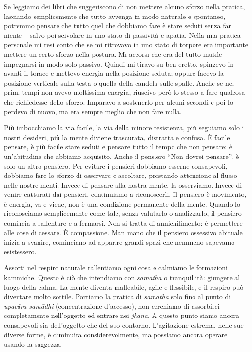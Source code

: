 Se leggiamo dei libri che suggeriscono di non mettere alcuno sforzo
nella pratica, lasciando semplicemente che tutto avvenga in modo
naturale e spontaneo, potremmo pensare che tutto quel che dobbiamo fare
è stare seduti senza far niente -- salvo poi scivolare in uno stato di
passività e apatia. Nella mia pratica personale mi resi conto che se mi
ritrovavo in uno stato di torpore era importante mettere un certo sforzo
nella postura. Mi accorsi che era del tutto inutile impegnarsi in modo
solo passivo. Quindi mi tiravo su ben eretto, spingevo in avanti il
torace e mettevo energia nella posizione seduta; oppure facevo la
posizione verticale sulla testa o quella della candela sulle spalle.
Anche se nei primi tempi non avevo moltissima energia, riuscivo però lo
stesso a fare qualcosa che richiedesse dello sforzo. Imparavo a
sostenerlo per alcuni secondi e poi lo perdevo di nuovo, ma era sempre
meglio che non fare nulla.

Più imbocchiamo la via facile, la via della minore resistenza, più
seguiamo solo i nostri desideri, più la mente diviene trascurata,
distratta e confusa. È facile pensare, è più facile stare seduti e
pensare tutto il tempo che non pensare: è un'abitudine che abbiamo
acquisito. Anche il pensiero ``Non dovrei pensare'', è solo un altro
pensiero. Per evitare i pensieri dobbiamo esserne consapevoli, dobbiamo
fare lo sforzo di osservare e ascoltare, prestando attenzione al flusso
nelle nostre menti. Invece di pensare alla nostra mente, la osserviamo.
Invece di venire catturati dai pensieri, continuiamo a riconoscerli. Il
pensiero è movimento, è energia, va e viene, non è una condizione
permanente della mente. Quando lo riconosciamo semplicemente come tale,
senza valutarlo o analizzarlo, il pensiero comincia a rallentare e a
fermarsi. Non si tratta di annichilimento: è permettere alle cose di
cessare. È compassione. Man mano che il pensiero ossessivo abituale
inizia a svanire, cominciano ad apparire grandi spazi che nemmeno
sapevamo esistessero.

Assorti nel respiro naturale rallentiamo ogni cosa e calmiamo le
formazioni kammiche. Questo è ciò che intendiamo con \emph{samatha} o
tranquillità: giungere al luogo della calma. La mente diventa
malleabile, agile e flessibile, e il respiro può diventare molto
sottile. Portiamo la pratica di \emph{samatha} solo fino al punto di
\emph{upacāra samādhi} (concentrazione d'accesso), non cerchiamo di
assorbirci completamente nell'oggetto ed entrare nei \emph{jhāna}. A
questo punto siamo ancora consapevoli sia dell'oggetto che del suo
contorno. L'agitazione estrema, nelle sue diverse forme, è diminuita
considerevolmente, ma possiamo ancora operare usando la saggezza.

